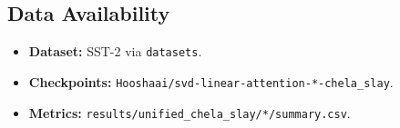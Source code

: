 \subsection{Data Availability}

\begin{itemize}
\item \textbf{Dataset:} SST-2 via \texttt{datasets}.
\item \textbf{Checkpoints:} \texttt{Hooshaai/svd-linear-attention-*-chela\_slay}.
\item \textbf{Metrics:} \texttt{results/unified\_chela\_slay/*/summary.csv}.

\end{itemize}
